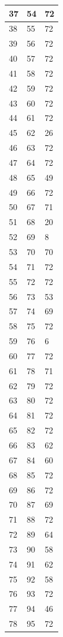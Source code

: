 \begin{tabular}{p{}p{}p{}}
\hline
37 & 54 & 72 \\
\hline
38 & 55 & 72 \\
\hline
39 & 56 & 72 \\
\hline
40 & 57 & 72 \\
\hline
41 & 58 & 72 \\
\hline
42 & 59 & 72 \\
\hline
43 & 60 & 72 \\
\hline
44 & 61 & 72 \\
\hline
45 & 62 & 26 \\
\hline
46 & 63 & 72 \\
\hline
47 & 64 & 72 \\
\hline
48 & 65 & 49 \\
\hline
49 & 66 & 72 \\
\hline
50 & 67 & 71 \\
\hline
51 & 68 & 20 \\
\hline
52 & 69 & 8 \\
\hline
53 & 70 & 70 \\
\hline
54 & 71 & 72 \\
\hline
55 & 72 & 72 \\
\hline
56 & 73 & 53 \\
\hline
57 & 74 & 69 \\
\hline
58 & 75 & 72 \\
\hline
59 & 76 & 6 \\
\hline
60 & 77 & 72 \\
\hline
61 & 78 & 71 \\
\hline
62 & 79 & 72 \\
\hline
63 & 80 & 72 \\
\hline
64 & 81 & 72 \\
\hline
65 & 82 & 72 \\
\hline
66 & 83 & 62 \\
\hline
67 & 84 & 60 \\
\hline
68 & 85 & 72 \\
\hline
69 & 86 & 72 \\
\hline
70 & 87 & 69 \\
\hline
71 & 88 & 72 \\
\hline
72 & 89 & 64 \\
\hline
73 & 90 & 58 \\
\hline
74 & 91 & 62 \\
\hline
75 & 92 & 58 \\
\hline
76 & 93 & 72 \\
\hline
77 & 94 & 46 \\
\hline
78 & 95 & 72 \\

\end{tabular}
